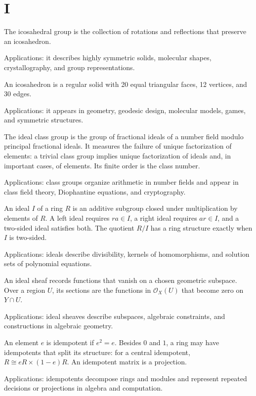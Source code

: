 \chapter*{I}
\label{chap:i}

The icosahedral group is the collection of rotations and reflections that preserve an icosahedron. \par\noindent Applications: it describes highly symmetric solids, molecular shapes, crystallography, and group representations.

An icosahedron is a regular solid with 20 equal triangular faces, 12 vertices, and 30 edges. \par\noindent Applications: it appears in geometry, geodesic design, molecular models, games, and symmetric structures.

The ideal class group is the group of fractional ideals of a number field modulo principal fractional ideals. It measures the failure of unique factorization of elements: a trivial class group implies unique factorization of ideals and, in important cases, of elements. Its finite order is the class number. \par\noindent Applications: class groups organize arithmetic in number fields and appear in class field theory, Diophantine equations, and cryptography.

An ideal $I$ of a ring $R$ is an additive subgroup closed under multiplication by elements of $R$. A left ideal requires $ra\in I$, a right ideal requires $ar\in I$, and a two-sided ideal satisfies both. The quotient $R/I$ has a ring structure exactly when $I$ is two-sided. \par\noindent Applications: ideals describe divisibility, kernels of homomorphisms, and solution sets of polynomial equations.

An ideal sheaf records functions that vanish on a chosen geometric subspace. Over a region $U$, its sections are the functions in $\mathcal O_X(U)$ that become zero on $Y\cap U$. \par\noindent Applications: ideal sheaves describe subspaces, algebraic constraints, and constructions in algebraic geometry.

An element $e$ is idempotent if $e^2=e$. Besides $0$ and $1$, a ring may have idempotents that split its structure: for a central idempotent, $R\cong eR\times(1-e)R$. An idempotent matrix is a projection. \par\noindent Applications: idempotents decompose rings and modules and represent repeated decisions or projections in algebra and computation.

